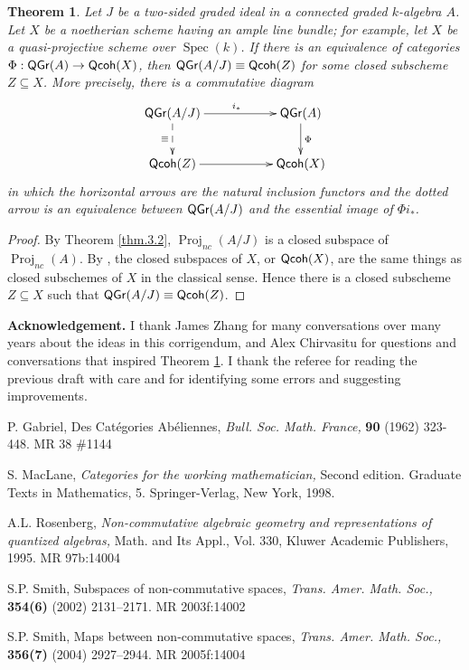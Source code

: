 \documentclass[10pt]{amsart}
\newtheorem{theorem}[lemma]{Theorem}
\numberwithin{equation}{section}
\def\Projnc{\operatorname{Proj}_{nc}}
\def\QGr{\operatorname{\sf QGr}}
\def\Spec{\operatorname{Spec}}
\def\Qcoh{{\sf Qcoh}}
\begin{document}
\begin{theorem}
\label{thm2}
Let $J$ be a two-sided graded ideal in a connected graded $k$-algebra  $A$.
Let $X$ be a noetherian scheme having an ample line bundle; for example, let $X$ be 
a quasi-projective scheme over $\Spec(k)$.  
If  there is an equivalence of categories $\Phi:\QGr(A) \to \Qcoh(X)$,  then $\QGr(A/J)  \equiv \Qcoh(Z)$ for some closed subscheme $Z \subseteq X$. 
More precisely, there is a  commutative diagram
$$
\xymatrix{
 \QGr(A/J)  \ar@{-->}[d]_{\equiv} \ar[rr]^{i_*} && \QGr(A) \ar[d]^\Phi
\\ 
\Qcoh(Z) \ar[rr]  && \Qcoh(X)
}
$$
in which the horizontal arrows are the natural inclusion functors and the dotted arrow is an equivalence  
between $ \QGr(A/J) $ and  the essential image of $\Phi i_*$.
\end{theorem}
\begin{proof}
By Theorem \ref{thm.3.2},  $\Projnc(A/J)$ is a closed subspace of $\Projnc(A)$. 
By \cite[Thm. 4.1]{S2}, the closed subspaces of $X$, or $\Qcoh(X)$, are 
the same things as closed subschemes of $X$ in the classical sense.
Hence there is a closed subscheme $Z \subseteq X$
such that   $\QGr(A/J) \equiv \Qcoh(Z)$.  
\end{proof}

{\bf Acknowledgement.}
I thank James Zhang for many conversations over many years about the ideas in this 
corrigendum, and Alex Chirvasitu for questions and conversations that inspired Theorem \ref{thm2}.
I thank the referee for reading the previous draft with care and for identifying some errors and suggesting 
improvements. 
 

 
 
 
 
 
 
 
 
  \begin{thebibliography}{12}
  
 

P. Gabriel, Des Cat\'egories Ab\'eliennes, {\it Bull. Soc. Math. France,}
{\bf 90} (1962) 323-448. MR 38 \#1144

S. MacLane,  
{\it Categories for the working mathematician,}  
Second edition. Graduate Texts in Mathematics, 5. Springer-Verlag, New York, 1998. 

A.L. Rosenberg, {\it Non-commutative algebraic geometry and representations of quantized algebras,}
 Math. and Its Appl., Vol. 330, Kluwer Academic Publishers, 1995. MR 97b:14004

S.P. Smith,  Subspaces of  non-commutative spaces, {\it Trans. Amer. Math. Soc.,}
{\bf 354(6)} (2002) 2131--2171. MR 2003f:14002

S.P. Smith,  Maps between non-commutative spaces, {\it Trans. Amer. Math. Soc.,}
{\bf 356(7)} (2004) 2927--2944. MR 2005f:14004





\end{thebibliography}
\end{document}
